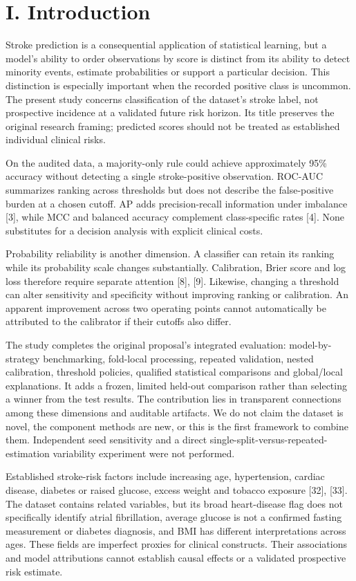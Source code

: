 \documentclass[10pt,twocolumn,letterpaper]{article}
\begin{document}
\section*{I. Introduction}
Stroke prediction is a consequential application of statistical learning, but a model's ability to order observations by score is distinct from its ability to detect minority events, estimate probabilities or support a particular decision. This distinction is especially important when the recorded positive class is uncommon. The present study concerns classification of the dataset's stroke label, not prospective incidence at a validated future risk horizon. Its title preserves the original research framing; predicted scores should not be treated as established individual clinical risks.


On the audited data, a majority-only rule could achieve approximately 95\% accuracy without detecting a single stroke-positive observation. ROC-AUC summarizes ranking across thresholds but does not describe the false-positive burden at a chosen cutoff. AP adds precision-recall information under imbalance [3], while MCC and balanced accuracy complement class-specific rates [4]. None substitutes for a decision analysis with explicit clinical costs.


Probability reliability is another dimension. A classifier can retain its ranking while its probability scale changes substantially. Calibration, Brier score and log loss therefore require separate attention [8], [9]. Likewise, changing a threshold can alter sensitivity and specificity without improving ranking or calibration. An apparent improvement across two operating points cannot automatically be attributed to the calibrator if their cutoffs also differ.


The study completes the original proposal's integrated evaluation: model-by-strategy benchmarking, fold-local processing, repeated validation, nested calibration, threshold policies, qualified statistical comparisons and global/local explanations. It adds a frozen, limited held-out comparison rather than selecting a winner from the test results. The contribution lies in transparent connections among these dimensions and auditable artifacts. We do not claim the dataset is novel, the component methods are new, or this is the first framework to combine them. Independent seed sensitivity and a direct single-split-versus-repeated-estimation variability experiment were not performed.


Established stroke-risk factors include increasing age, hypertension, cardiac disease, diabetes or raised glucose, excess weight and tobacco exposure [32], [33]. The dataset contains related variables, but its broad heart-disease flag does not specifically identify atrial fibrillation, average glucose is not a confirmed fasting measurement or diabetes diagnosis, and BMI has different interpretations across ages. These fields are imperfect proxies for clinical constructs. Their associations and model attributions cannot establish causal effects or a validated prospective risk estimate.
\end{document}
